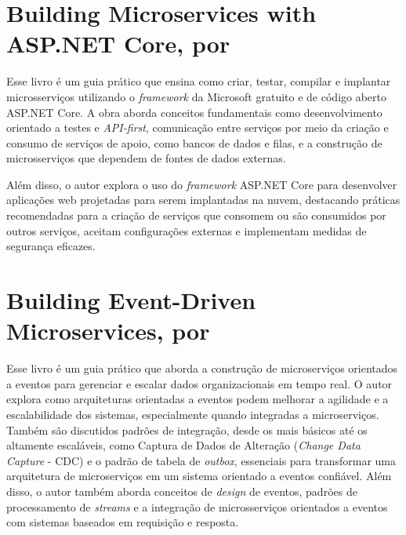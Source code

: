 
\section{Building Microservices with ASP.NET Core, por \texorpdfstring{}{Hoffman (2017)}}

Esse livro é um guia prático que ensina como criar, testar, compilar e implantar microsserviços utilizando o \emph{framework} da Microsoft gratuito e de código aberto ASP.NET Core. A obra aborda conceitos fundamentais como desenvolvimento orientado a testes e \emph{API-first}, comunicação entre serviços por meio da criação e consumo de serviços de apoio, como bancos de dados e filas, e a construção de microsserviços que dependem de fontes de dados externas.

Além disso, o autor explora o uso do \emph{framework} ASP.NET Core para desenvolver aplicações web projetadas para serem implantadas na nuvem, destacando práticas recomendadas para a criação de serviços que consomem ou são consumidos por outros serviços, aceitam configurações externas e implementam medidas de segurança eficazes.


\section{Building Event-Driven Microservices, por \texorpdfstring{}{Bellemare (2020)}}
Esse livro é um guia prático que aborda a construção de microserviços orientados a eventos para gerenciar e escalar dados organizacionais em tempo real. O autor explora como arquiteturas orientadas a eventos podem melhorar a agilidade e a escalabilidade dos sistemas, especialmente quando integradas a microserviços. Também são discutidos padrões de integração, desde os mais básicos até os altamente escaláveis, como Captura de Dados de Alteração (\emph{Change Data Capture} - CDC) e o padrão de tabela de \emph{outbox}, essenciais para transformar uma arquitetura de microserviços em um sistema orientado a eventos confiável. Além disso, o autor também aborda conceitos de \emph{design} de eventos, padrões de processamento de \emph{streams} e a integração de microsserviços orientados a eventos com sistemas baseados em requisição e resposta. 

